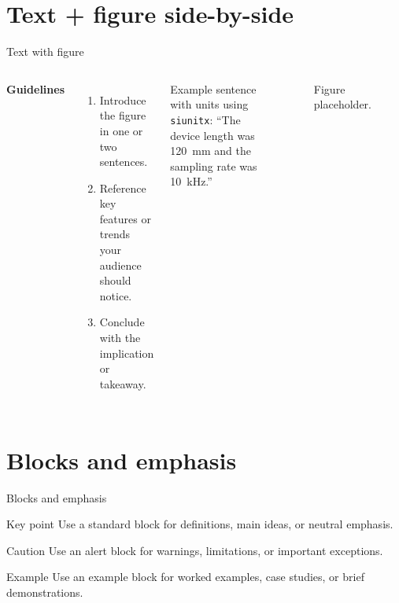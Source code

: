 \documentclass[10pt, aspectratio=169]{beamer}
\begin{document}
\section{Text + figure side-by-side}
\begin{frame}[t]{Text with figure}
\begin{columns}[T,onlytextwidth]
  \textbf{Guidelines}
  \begin{enumerate}
    \item Introduce the figure in one or two sentences.
    \item Reference key features or trends your audience should notice.
    \item Conclude with the implication or takeaway.
  \end{enumerate}

  Example sentence with units using \texttt{siunitx}: ``The device length was \SI{120}{mm} and the sampling rate was \SI{10}{kHz}.''

  \begin{figure}
    \centering
    \setlength{\fboxsep}{0pt}%
    \fbox{\rule{0pt}{3cm}\rule{.9\linewidth}{0pt}}
    \caption{Figure placeholder.}
  \end{figure}
\end{columns}
\end{frame}

\section{Blocks and emphasis}
\begin{frame}[t]{Blocks and emphasis}
\begin{block}{Key point}
Use a standard block for definitions, main ideas, or neutral emphasis.
\end{block}

\begin{alertblock}{Caution}
Use an alert block for warnings, limitations, or important exceptions.
\end{alertblock}

\begin{exampleblock}{Example}
Use an example block for worked examples, case studies, or brief demonstrations.
\end{exampleblock}
\end{frame}

\end{document}
